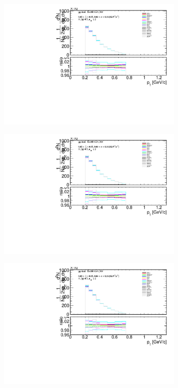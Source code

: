 \begin{figure}[h!]
	\centering
	\begin{subfigure}{.49\textwidth}
		\includegraphics[width=\textwidth,page=19]{chapters/chrgSTAR/img/syst/outPID_SDT.pdf}
	\end{subfigure}
	\begin{subfigure}{.49\textwidth}
		\includegraphics[width=\textwidth,page=20]{chapters/chrgSTAR/img/syst/outPID_SDT.pdf}
	\end{subfigure}
	\begin{subfigure}{.49\textwidth}
		\includegraphics[width=\textwidth,page=21]{chapters/chrgSTAR/img/syst/outPID_SDT.pdf}

\end{subfigure}
\end{figure}
